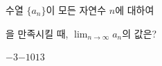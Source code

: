 수열 $\{a_n\}$이 모든 자연수 $n$에 대하여 \par\smallskip{}\par\smallskip\noindent 을 만족시킬 때, $\displaystyle\lim_{n\to\infty}a_n$의 값은?
\begin{choices32}{$-3$}{$-1$}{$0$}{$1$}{$3$}\end{choices32}
